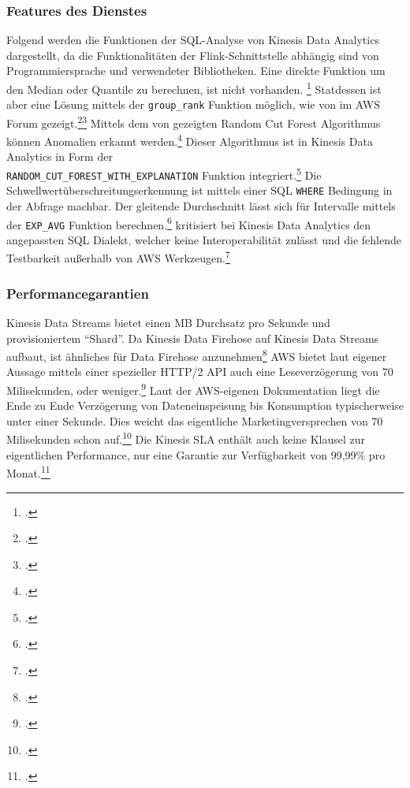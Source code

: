 \subsubsection{Features des Dienstes}
Folgend werden die Funktionen der \ac{SQL}-Analyse von Kinesis Data Analytics dargestellt, da die Funktionalitäten der Flink-Schnittstelle abhängig sind von Programmiersprache und verwendeter Bibliotheken. 
Eine direkte Funktion um den Median oder Quantile zu berechnen, ist nicht vorhanden. \footcite[Vgl.][]{RyanN.2018} Statdessen ist aber eine Lösung mittels der \texttt{group_rank} Funktion möglich, wie von \citeauthor{RyanN.2018} im \ac{AWS} Forum gezeigt.\footcite[Vgl.][]{AmazonWebServicesInc..o.J.as}\nzitat\footcite[Vgl.][]{RyanN.2018}
Mittels dem von \citeauthor{Guha.2016} gezeigten Random Cut Forest Algorithmus können Anomalien erkannt werden.\footcite[Vgl.][1]{Guha.2016} Dieser Algorithmus ist in Kinesis Data Analytics in Form der \\ \texttt{RANDOM_CUT_FOREST_WITH_EXPLANATION} Funktion integriert.\footcite[Vgl.][]{AmazonWebServicesInc..o.J.ar}
Die Schwellwertüberschreitungserkennung ist mittels einer \ac{SQL} \texttt{WHERE} Bedingung in der Abfrage machbar.
Der gleitende Durchschnitt lässt sich für Intervalle mittels der \texttt{EXP_AVG} Funktion berechnen.\footcite[Vgl.][]{AmazonWebServicesInc..o.J.aq}
\citeauthor{Herman.2020} kritisiert bei Kinesis Data Analytics den angepassten \ac{SQL} Dialekt, welcher keine Interoperabilität zulässt und die fehlende Testbarkeit außerhalb von \ac{AWS} Werkzeugen.\footcite[Vgl.][]{Herman.2020}

\subsubsection{Performancegarantien}
Kinesis Data Streams bietet einen MB Durchsatz pro Sekunde und provisioniertem \enquote{Shard}. Da Kinesis Data Firehose auf Kinesis Data Streams aufbaut, ist ähnliches für Data Firehose anzunehmen\footcite[Vgl.][]{Pogosova.28.05.2020} 
\ac{AWS} bietet laut eigener Aussage mittels einer spezieller HTTP/2 \ac{API} auch eine Leseverzögerung von 70 Milisekunden, oder weniger.\footcite[Vgl.][]{AmazonWebServicesInc..o.J.af} 
Laut der \ac{AWS}-eigenen Dokumentation liegt die Ende zu Ende Verzögerung von Dateneinspeisung bis Konsumption typischerweise unter einer Sekunde. Dies weicht das eigentliche Marketingversprechen von 70 Milisekunden schon auf.\footcite[Vgl.][]{AmazonWebServicesInc..o.J.ae}
Die Kinesis \ac{SLA} enthält auch keine Klausel zur eigentlichen Performance, nur eine Garantie zur Verfügbarkeit von 99,99\% pro Monat.\footcite[Vgl.][]{AmazonWebServicesInc..o.J.ad} 

